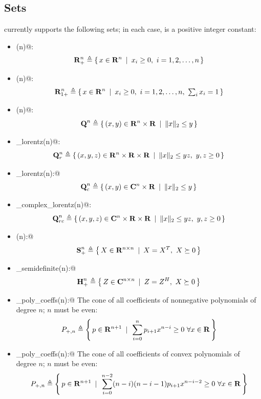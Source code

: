 \documentclass[12pt]{article}
\newcommand{\symm}{{\mbox{\bf S}}}  %
\newcommand{\herm}{{\mbox{\bf H}}}  %
\newcommand{\lorentz}{{\mbox{\bf Q}}}  %
\begin{document}
\subsection{Sets}

\cvx currently supports the following sets; in each case, \verb@n@ is a positive
integer constant:
\begin{itemize}
\item \verb@nonnegative(n)@:
\begin{equation*}
	\mathbf{R}^n_+ \triangleq \left\{\,x\in\mathbf{R}^{n}\,~|~\,x_i\geq 0,~i=1,2,\dots,n\,\right\}
\end{equation*}	
\item \verb@simplex(n)@:
\begin{equation*}
	\mathbf{R}^n_{1+} \triangleq \left\{\,x\in\mathbf{R}^{n}\,~|~\,x_i\geq 0,~i=1,2,\dots,n,~\textstyle\sum_ix_i=1\,\right\}
\end{equation*}	
\item \verb@lorentz(n)@:
\begin{equation*}
\lorentz^n \eqbydef \Condset{(x,y)\in\R^n\times\R}{\|x\|_2\leq y}
\end{equation*}
\item \verb@rotated_lorentz(n)@: 
\begin{equation*}
\lorentz^n_r \eqbydef \Condset{(x,y,z)\in\R^n\times\R\times\R}{\|x\|_2\leq yz,~y,z\geq 0}
\end{equation*}
\item \verb@complex_lorentz(n):@ 
\begin{equation*}
\lorentz^n_c \eqbydef \Condset{(x,y)\in\complex^n\times\R}{\|x\|_2\leq y}
\end{equation*}
\item \verb@rotated_complex_lorentz(n)@: 
\begin{equation*}
\lorentz^n_{rc} \eqbydef \Condset{(x,y,z)\in\complex^n\times\R\times\R}{\|x\|_2\leq yz,~y,z\geq 0}
\end{equation*}
\item \verb@semidefinite(n):@ 
\begin{equation*}
\symm^n_+ \eqbydef \Condset{X\in\R^{n\times n}}{X=X^T,~X\succeq 0}
\end{equation*}
\item \verb@hermitian_semidefinite(n):@ 
\begin{equation*}
\herm^n_+ \eqbydef \Condset{Z\in\complex^{n\times n}}{Z=Z^H,~X\succeq 0}
\end{equation*}
\item \verb@nonneg_poly_coeffs(n):@ The cone of all coefficients of nonnegative
polynomials of degree $n$; $n$ must be even:
\begin{equation*}
P_{+,n} \eqbydef \Condset{p\in\Rn[n+1]}{\sum_{i=0}^n p_{i+1} x^{n-i} \geq 0 ~ \forall x\in\R }
\end{equation*}
\item \verb@convex_poly_coeffs(n):@ The cone of all coefficients of convex
polynomials of degree $n$; $n$ must be even:
\begin{equation*}
P_{+,n} \eqbydef \Condset{p\in\Rn[n+1]}{\sum_{i=0}^{n-2} (n-i)(n-i-1) p_{i+1} x^{n-i-2} \geq 0 ~ \forall x\in\R }
\end{equation*}
\end{itemize}
\end{document}
